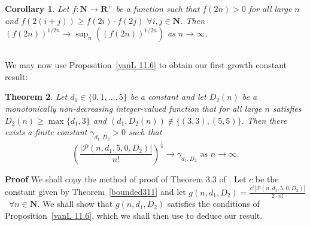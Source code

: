 \documentclass{article}
\newtheorem{Theorem}{Theorem}
\newtheorem{Corollary}[Theorem]{Corollary}
\newtheorem{Proof of Theorem}{Proof of Theorem}
\begin{document}
\begin{Corollary} \label{bounded103}
Let $f:\mathbf{N} \to \mathbf{R}^{+}$ be a function such that
$f(2n)>0$ for all large $n$ and
$f(2(i+j)) \geq f(2i) \cdot f(2j)$ $\forall i,j \in \mathbf{N}$.
Then $(f(2n))^{1/2n} \to \sup_{n} \left( (f(2n))^{1/2n} \right)$ as $n \to \infty$. 
\end{Corollary}
\begin{displaymath}
\end{displaymath} 















We may now use Proposition~\ref{vanL 11.6} to obtain our first growth constant result:















\begin{Theorem} \label{bounded104}
Let $d_{1} \in \{ 0,1, \ldots, 5 \}$ be a constant and 
let $D_{2}(n)$ be a monotonically non-decreasing integer-valued function that for all large $n$ satisfies
$D_{2}(n) \geq \max \{ d_{1}, 3 \}$ and $(d_{1},D_{2}(n)) \notin \{ (3,3), (5,5) \}$.
Then there exists a \emph{finite} constant $\gamma_{d_{1},D_{2}} >0$ such that
\begin{displaymath}
\left( \frac{|\mathcal{P}(n,d_{1},5,0,D_{2})|}{n!} \right)^{\frac{1}{n}} \to 
\gamma_{d_{1},D_{2}} 
\textrm{ as } n \to \infty.
\end{displaymath}
\end{Theorem}
\textbf{Proof}
We shall copy the method of proof of Theorem 3.3 of \cite{mcd}.
Let $c$ be the constant given by Theorem~\ref{bounded311} and
let $g(n,d_{1},D_{2}) = \frac{c^{2}|\mathcal{P}(n,d_{1},5,0,D_{2})|}{2 \cdot n!}$~$\forall n \in \mathbf{N}$.
We shall show that $g(n,d_{1},D_{2})$ satisfies the conditions of Proposition~\ref{vanL 11.6},
which we shall then use to deduce our result. \\
\end{document}
